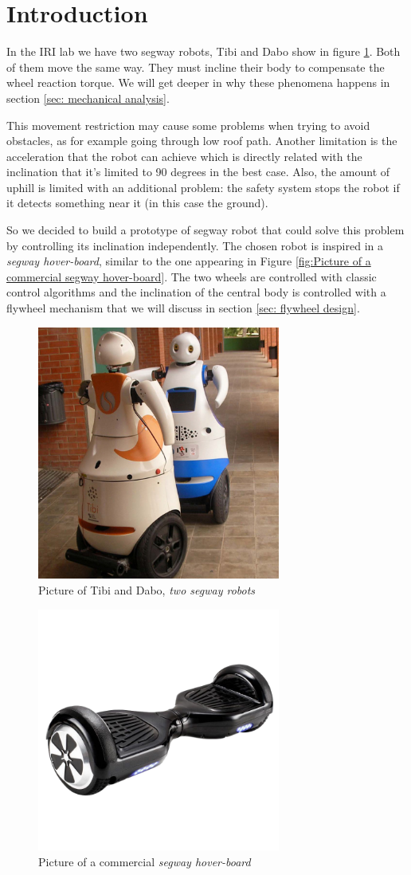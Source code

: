 \section{Introduction}
In the IRI lab we have two segway robots, Tibi and Dabo show in figure
\ref{fig:Picture of Tibi and Dabo}. Both of them move the same way.
They must incline their body to compensate the wheel reaction torque. We will get deeper
in why these phenomena happens in section \ref{sec: mechanical analysis}.

This movement restriction may cause some problems when trying to avoid obstacles,
as for example going through low roof path. Another limitation is the
acceleration that the robot can achieve which is directly related with the inclination
that it's limited to 90 degrees in the best case. Also, the amount of uphill
is limited with an additional problem: the safety system stops the robot if 
it detects something near it (in this case the ground).

So we decided to build a prototype of segway robot that could solve this problem by 
controlling its inclination independently. The chosen robot is inspired in a
\textit{segway hover-board}, similar to the one appearing in Figure \ref{fig:Picture of a commercial 
segway hover-board}. The two wheels are controlled with classic control algorithms and the
inclination of the central body is controlled with a flywheel mechanism that we will
discuss in section \ref{sec: flywheel design}.
\begin{figure}
	\centering
	\includegraphics[width=8cm]{img/robots-TIBI-i-DABO-IRI-red.jpg}
	\caption{Picture of Tibi and Dabo, \textit{two segway robots} }
	\label{fig:Picture of Tibi and Dabo}
\end{figure}

\begin{figure}
	\centering
	\includegraphics[width=8cm]{img/segway_hoverboard_picture.png}
	\caption{Picture of a commercial \textit{segway hover-board} }
	\label{fig:Picture of a commercial segway hover-board}
\end{figure}

